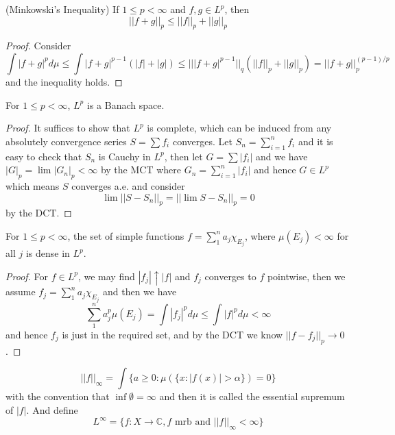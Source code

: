 \documentclass[lang=en, color=blue, ]{elegantbook}
\newcommand{\C}{\mathbb{C}}
\begin{document}
\begin{theorem}
    (Minkowski's Inequality) If $1\leq p <\infty$ and $f,g \in L^p$, then
    \[||f+g||_p \leq ||f||_p + ||g||_p\]
\end{theorem}
\begin{proof}\par
    Consider
    \[
    \int |f+g|^p d\mu \leq \int |f+g|^{p-1}(|f|+|g|) \leq |||f+g|^{p-1}||_q(||f||_p+||g||_p) = ||f+g||_p^{(p-1)/p}
    \]
    and the inequality holds.
\end{proof}

\begin{theorem}
    For $1\leq p < \infty$, $L^p$ is a Banach space.
\end{theorem}
\begin{proof}\par
    It suffices to show that $L^p$ is complete, which can be induced from any absolutely convergence series $S=\sum\limits f_i$ converges. Let $S_n = \sum\limits_{i=1}^n f_i$ and it is easy to check that $S_n$ is Cauchy in $L^p$, then let $G = \sum |f_i|$ and we have $|G|_p = \lim |G_n|_p < \infty$ by the MCT where $G_n = \sum\limits_{i=1}^n |f_i|$ and hence $G\in L^p$ which means $S$ converges a.e. and consider
    \[ \lim||S-S_n||_p = ||\lim S-S_n||_p = 0\]
    by the DCT.
\end{proof}

\begin{proposition}
    For $ 1\leq p < \infty$, the set of simple functions $f = \sum\limits_1^n a_j \chi_{E_j}$, where $\mu(E_j) < \infty$ for all $j$ is dense in $L^p$.
\end{proposition}

\begin{proof}\par
    For $f\in L^p$, we may find $|f_j|\uparrow |f|$ and $f_j$ converges to $f$ pointwise, then we assume $f_j = \sum_1^n a_j\chi_{E_j}$ and then we have
    \[
    \sum_1^n a_j^p\mu(E_j) = \int |f_j|^p d\mu \leq \int |f|^p d\mu <\infty
    \]
    and hence $f_j$ is just in the required set, and by the DCT we know $||f-f_j||_p \to 0$.
\end{proof}

\begin{definition}
    \[||f||_{\infty} = \int\{a \geq 0:\mu(\{x:|f(x)|>\alpha\}) = 0\}\]
    with the convention that $\inf\emptyset = \infty$ and then it is called the essential supremum of $|f|$. And define
    \[L^{\infty} = \{f:X\to\C, f\text{ mrb and }||f||_{\infty} < \infty\}\]
\end{definition}
\end{document}

